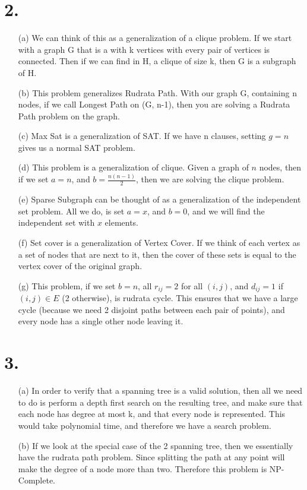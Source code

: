 \documentclass[11pt]{article}
\begin{document}
\section*{2.}
\begin{enumerate}
\item[(a)] We can think of this as a generalization of a clique problem. If we
start with a graph G that is a with k vertices with every pair of vertices is
connected. Then if we can find in H, a clique of size k, then G is a subgraph
of H.

\item[(b)]
This problem generalizes Rudrata Path. With our graph G, containing n nodes, if
we call Longest Path on (G, n-1), then you are solving a Rudrata Path problem
on the graph. 

\item[(c)]
Max Sat is a generalization of SAT. If we have n clauses, setting $g = n$ gives
us a normal SAT problem.

\item[(d)]
This problem is a generalization of clique. Given a graph of $n$ nodes, then if
we set $a = n$, and $b = \frac{n(n-1)}{2}$, then we are solving the clique
problem.

\item[(e)]
Sparse Subgraph can be thought of as a generalization of the independent set
problem. All we do, is set $a = x$, and $b = 0$, and we will find the
independent set with $x$ elements.

\item[(f)]
Set cover is a generalization of Vertex Cover. If we think of each vertex as a
set of nodes that are next to it, then the cover of these sets is equal to the
vertex cover of the original graph. 

\item[(g)]
This problem, if we set $b=n$, all $r_{ij} = 2$ for all $(i, j)$, and
$d_{ij} = 1$ if $(i, j) \in E$ (2 otherwise), is rudrata cycle. This ensures
that we have a large cycle (because we need 2 disjoint paths between each pair
of points), and every node has a single other node leaving it. 
\end{enumerate}
\newpage
\section*{3.}
\begin{enumerate}
\item[(a)] In order to verify that a spanning tree is a valid solution, then
all we need to do is perform a depth first search on the resulting tree, and
make sure that each node has degree at most k, and that every node is
represented. This would take polynomial time, and therefore we have a search
problem. 
\item[(b)] If we look at the special case of the 2 spanning tree, then we
essentially have the rudrata path problem. Since splitting the path at any
point will make the degree of a node more than two. Therefore this problem is
NP-Complete. 
\end{enumerate}
\newpage
\end{document}
